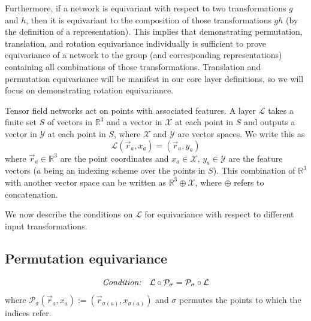 \documentclass{article}
\begin{document}
Furthermore, if a network is equivariant with respect to two transformations $g$ and $h$, then it is equivariant to the composition of those transformations $gh$ (by the definition of a representation).  This implies that demonstrating permutation, translation, and rotation equivariance individually is sufficient to prove equivariance of a network to the group (and corresponding representations) containing all combinations of those transformations.  Translation and permutation equivariance will be manifest in our core layer definitions, so we will focus on demonstrating rotation equivariance.

Tensor field networks act on points with associated features.  A layer $\mathcal{L}$ takes a finite set $S$ of vectors in $\mathbb{R}^3$ and a vector in $\mathcal{X}$ at each point in $S$ and outputs a vector in $\mathcal{Y}$ at each point in $S$, where $\mathcal{X}$ and $\mathcal{Y}$ are vector spaces.  We write this as
\[\mathcal{L}(\vec{r}_a, x_a) = (\vec{r}_{a}, y_{a})\]
where $\vec{r}_a \in \mathbb{R}^3$ are the point coordinates and $x_a\in \mathcal{X}$, $y_{a}\in \mathcal{Y}$ are the feature vectors ($a$ being an indexing scheme over the points in $S$).  %
This combination of $\mathbb{R}^3$ with another vector space can be written as $\mathbb{R}^3 \oplus \mathcal{X}$, where $\oplus$ refers to concatenation. %
% 
% 
% 

We now describe the conditions on $\mathcal{L}$ for equivariance with respect to different input transformations.

\subsection{Permutation equivariance}
\[\text{{\em Condition:}} \quad \mathcal{L} \circ \mathcal{P}_\sigma = \mathcal{P}_\sigma \circ \mathcal{L}\]
where $\mathcal{P}_\sigma(\vec{r}_a, x_a) := (\vec{r}_{\sigma(a)}, x_{\sigma(a)})$ and $\sigma$ permutes the points to which the indices refer.
\end{document}
